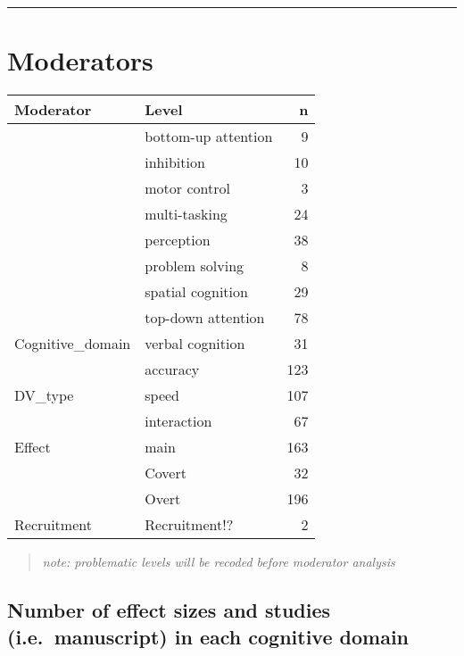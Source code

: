 \documentclass[
]{book}
\begin{document}
\begin{center}\rule{0.5\linewidth}{0.5pt}\end{center}

\hypertarget{moderators}{%
\section{Moderators}\label{moderators}}

\begin{tabular}{l|l|r}
\hline
Moderator & Level & n\\
\hline
 & bottom-up attention & 9\\
\cline{2-3}
 & inhibition & 10\\
\cline{2-3}
 & motor control & 3\\
\cline{2-3}
 & multi-tasking & 24\\
\cline{2-3}
 & perception & 38\\
\cline{2-3}
 & problem solving & 8\\
\cline{2-3}
 & spatial cognition & 29\\
\cline{2-3}
 & top-down attention & 78\\
\cline{2-3}
\multirow[t]{-9}{*}{\raggedright\arraybackslash Cognitive\_domain} & verbal cognition & 31\\
\cline{1-3}
 & accuracy & 123\\
\cline{2-3}
\multirow[t]{-2}{*}{\raggedright\arraybackslash DV\_type} & speed & 107\\
\cline{1-3}
 & interaction & 67\\
\cline{2-3}
\multirow[t]{-2}{*}{\raggedright\arraybackslash Effect} & main & 163\\
\cline{1-3}
 & Covert & 32\\
\cline{2-3}
 & Overt & 196\\
\cline{2-3}
\multirow[t]{-3}{*}{\raggedright\arraybackslash Recruitment} & Recruitment!? & 2\\
\hline
\end{tabular}

\begin{quote}
\emph{note: problematic levels will be recoded before moderator analysis}
\end{quote}

\hypertarget{number-of-effect-sizes-and-studies-i.e.-manuscript-in-each-cognitive-domain}{%
\subsection{Number of effect sizes and studies (i.e.~manuscript) in each cognitive domain}\label{number-of-effect-sizes-and-studies-i.e.-manuscript-in-each-cognitive-domain}}
\end{document}
